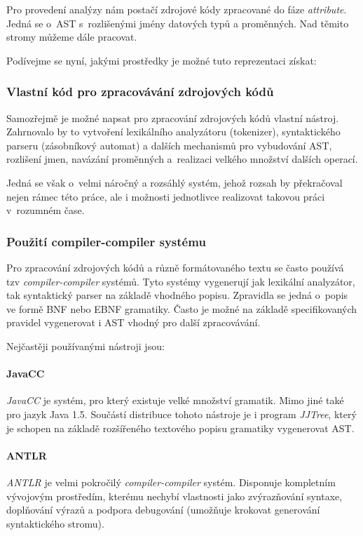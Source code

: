 Pro provedení analýzy nám postačí zdrojové kódy zpracované do fáze \emph{attribute}. Jedná se o~AST s~rozlišenými jmény datových typů a proměnných. Nad těmito stromy můžeme dále pracovat.

Podívejme se nyní, jakými prostředky je možné tuto reprezentaci získat:

\subsubsection{Vlastní kód pro zpracovávání zdrojových kódů}
Samozřejmě je možné napsat pro zpracování zdrojových kódů vlastní nástroj. Zahrnovalo by to vytvoření lexikálního analyzátoru (tokenizer), syntaktického parseru (zásobníkový automat) a dalších mechanismů pro vybudování AST, rozlišení jmen, navázání proměnných a~realizaci velkého množství dalších operací.

Jedná se však o~velmi náročný a rozsáhlý systém, jehož rozsah by překračoval nejen rámec této práce, ale i možnosti jednotlivce realizovat takovou práci v~rozumném čase.

\subsubsection{Použití compiler-compiler systému}
Pro zpracování zdrojových kódů a různě formátovaného textu se často používá tzv \emph{compiler-compiler} systémů. Tyto systémy vygenerují jak lexikální analyzátor, tak syntaktický parser na základě vhodného popisu. Zpravidla se jedná o~popis ve formě BNF nebo EBNF gramatiky. Často je možné na základě specifikovaných pravidel vygenerovat i AST vhodný pro další zpracovávání.

Nejčastěji používanými nástroji jsou:

\paragraph{JavaCC} \emph{JavaCC} \cite{parsertools:javacc} je systém, pro který existuje velké množství gramatik. Mimo jiné také pro jazyk Java 1.5. Součástí distribuce tohoto nástroje je i program \emph{JJTree}, který je schopen na základě rozšířeného textového popisu gramatiky vygenerovat AST.

\paragraph{ANTLR} \emph{ANTLR} \cite{parsertools:antlr} je velmi pokročilý \emph{compiler-compiler} systém. Disponuje kompletním vývojovým prostředím, kterému nechybí vlastnosti jako zvýrazňování syntaxe, doplňování výrazů a podpora debugování (umožňuje krokovat generování syntaktického stromu).

